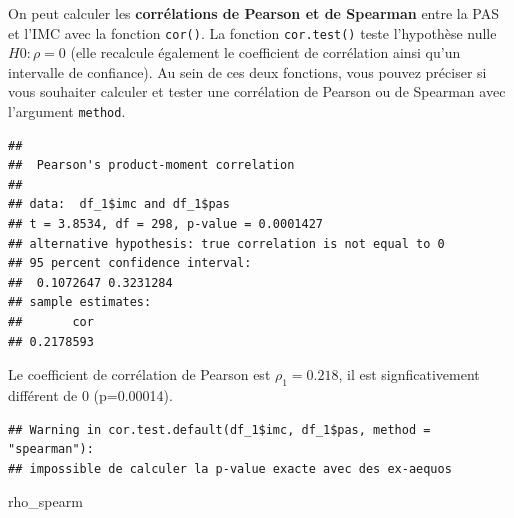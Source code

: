 \documentclass[
]{book}
\newenvironment{Shaded}{\begin{snugshade}}{\end{snugshade}}
\newcommand{\AttributeTok}[1]{\textcolor[rgb]{0.13,0.29,0.53}{#1}}
\newcommand{\DocumentationTok}[1]{\textcolor[rgb]{0.56,0.35,0.01}{\textbf{\textit{#1}}}}
\newcommand{\FunctionTok}[1]{\textcolor[rgb]{0.13,0.29,0.53}{\textbf{#1}}}
\newcommand{\NormalTok}[1]{#1}
\newcommand{\OtherTok}[1]{\textcolor[rgb]{0.56,0.35,0.01}{#1}}
\newcommand{\SpecialCharTok}[1]{\textcolor[rgb]{0.81,0.36,0.00}{\textbf{#1}}}
\newcommand{\StringTok}[1]{\textcolor[rgb]{0.31,0.60,0.02}{#1}}
\begin{document}
On peut calculer les \textbf{corrélations de Pearson et de Spearman} entre la PAS et l'IMC avec la fonction \texttt{cor()}. La fonction \texttt{cor.test()} teste l'hypothèse nulle \(H0: \rho = 0\) (elle recalcule également le coefficient de corrélation ainsi qu'un intervalle de confiance). Au sein de ces deux fonctions, vous pouvez préciser si vous souhaiter calculer et tester une corrélation de Pearson ou de Spearman avec l'argument \texttt{method}.

\begin{Shaded}
\end{Shaded}

\begin{verbatim}
## 
##  Pearson's product-moment correlation
## 
## data:  df_1$imc and df_1$pas
## t = 3.8534, df = 298, p-value = 0.0001427
## alternative hypothesis: true correlation is not equal to 0
## 95 percent confidence interval:
##  0.1072647 0.3231284
## sample estimates:
##       cor 
## 0.2178593
\end{verbatim}

Le coefficient de corrélation de Pearson est \(\rho_1 = 0.218\), il est signficativement différent de 0 (p=0.00014).

\begin{Shaded}
\end{Shaded}

\begin{verbatim}
## Warning in cor.test.default(df_1$imc, df_1$pas, method = "spearman"):
## impossible de calculer la p-value exacte avec des ex-aequos
\end{verbatim}

\begin{Shaded}
\begin{Highlighting}[]
\NormalTok{rho\_spearm}
\end{Highlighting}
\end{Shaded}
\end{document}
